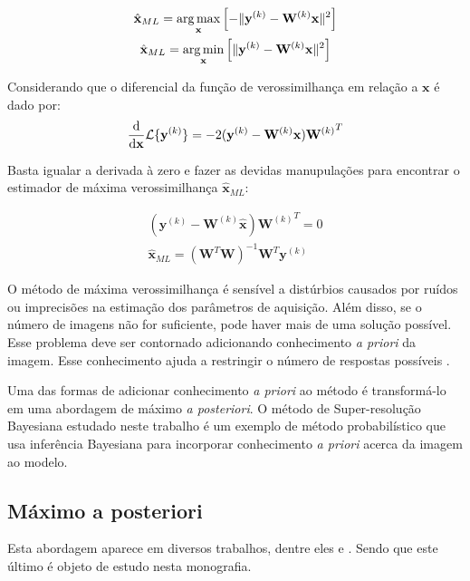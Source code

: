 \begin{gather}
	\label{eq:maxlhood}
	\hat{\mathbf{x}}_{ML} = \operatorname*{arg\,max}_{\mathbf{x}}
	\left[ - \|\mathbf{y}^{(k)} - \mathbf{W}^{(k)}\mathbf{x}\|^2 
	\right ] \\
	\hat{\mathbf{x}}_{ML} = \operatorname*{arg\,min}_{\mathbf{x}}
	\left[ \|\mathbf{y}^{(k)} - \mathbf{W}^{(k)}\mathbf{x}\|^2 
	\right ] 
\end{gather}


Considerando que o diferencial da função de verossimilhança em relação a $\mathbf{x}$ é dado por:
\begin{equation}
	\frac{\mathrm{d}}{\mathrm{d} \mathbf{x}}
	\mathcal{L}\{\mathbf{y}^{(k)}\} = -2 (\mathbf{y}^{(k)} - \mathbf{W}^{(k)}\mathbf{x}) {\mathbf{W}^{(k)}}^T \\
\end{equation}

Basta igualar a derivada à zero e fazer as devidas manupulações para encontrar o estimador de máxima verossimilhança $\hat{\mathbf{x}}_{ML}$: 

\begin{gather}
	(\mathbf{y}^{(k)} - \mathbf{W}^{(k)}\hat{\mathbf{x}}) {\mathbf{W}^{(k)}}^T = 0 \\
	\hat{\mathbf{x}}_{ML} = (\mathbf{W}^T\mathbf{W})^{-1} \mathbf{W}^T \mathbf{y}^{(k)}
\end{gather}

O método de máxima verossimilhança é sensível a distúrbios causados por ruídos ou
imprecisões na estimação dos parâmetros de aquisição.
Além disso, se o número de imagens não for suficiente, pode haver mais de uma solução
possível. Esse problema deve ser contornado adicionando conhecimento \emph{a priori} da
imagem.
Esse conhecimento ajuda a restringir o número de respostas possíveis \cite{nasrollahi2014super}.

Uma das formas de adicionar conhecimento \emph{a priori} ao método é transformá-lo em
uma abordagem de máximo \emph{a posteriori}.
O método de Super-resolução Bayesiana estudado neste trabalho é um exemplo de método probabilístico que usa inferência Bayesiana para incorporar conhecimento \emph{a priori} acerca da imagem ao modelo.

\subsection{Máximo a posteriori}
Esta abordagem aparece em diversos trabalhos, dentre eles \cite{pickup2007bayesian2,pickup2007bayesian} e \cite{tipping2003bayesian}.
Sendo que este último é objeto de estudo nesta monografia.

